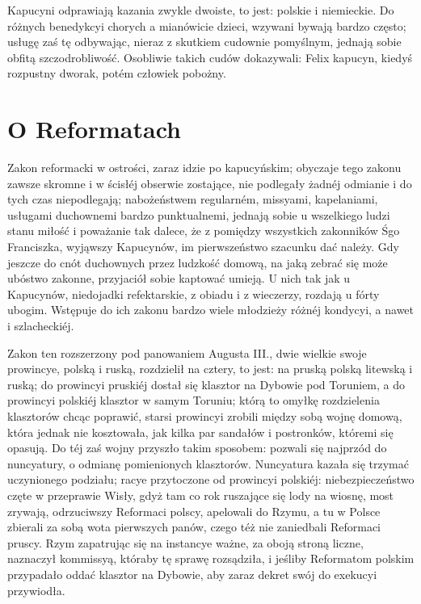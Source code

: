 \documentclass{book}
\begin{document}
Kapucyni odprawiają kazania zwykle dwoiste, to jest: polskie i niemieckie. Do różnych benedykcyi chorych a mianówicie dzieci, wzywani bywają bardzo często; usługę zaś tę odbywając, nieraz z skutkiem cudownie pomyślnym, jednają sobie obfitą szczodrobliwość. Osobliwie takich cudów dokazywali: Felix kapucyn, kiedyś rozpustny dworak, potém człowiek pobożny.

\section{O Reformatach}

Zakon reformacki w ostrości, zaraz idzie po kapucyńskim; obyczaje tego zakonu zawsze skromne i w ścisłéj obserwie zostające, nie podlegały żadnéj odmianie i do tych czas niepodlegają; nabożeństwem regularném, missyami, kapelaniami, usługami duchownemi bardzo punktualnemi, jednają sobie u wszelkiego ludzi stanu miłość i poważanie tak dalece, że z pomiędzy wszystkich zakonników Śgo Franciszka, wyjąwszy Kapucynów, im pierwszeństwo szacunku dać należy. Gdy jeszcze do cnót duchownych przez ludzkość domową, na jaką zebrać się może ubóstwo zakonne, przyjaciół sobie kaptować umieją. U nich tak jak u Kapucynów, niedojadki refektarskie, z obiadu i z wieczerzy, rozdają u fórty ubogim. Wstępuje do ich zakonu bardzo wiele młodzieży różnéj kondycyi, a nawet i szlacheckiéj.

Zakon ten rozszerzony pod panowaniem Augusta III., dwie wielkie swoje prowincye, polską i ruską, rozdzielił na cztery, to jest: na pruską polską litewską i ruską; do prowincyi pruskiéj dostał się klasztor na Dybowie pod Toruniem, a do prowincyi polskiéj klasztor w samym Toruniu; którą to omyłkę rozdzielenia klasztorów chcąc poprawić, starsi prowincyi zrobili między sobą wojnę domową, która jednak nie kosztowała, jak kilka par sandałów i postronków, któremi się opasują. Do téj zaś wojny przyszło takim sposobem: pozwali się najprzód do nuncyatury, o odmianę pomienionych klasztorów. Nuncyatura kazała się trzymać uczynionego podziału; racye przytoczone od prowincyi polskiéj: niebezpieczeństwo częte w przeprawie Wisły, gdyż tam co rok ruszające się lody na wiosnę, most zrywają, odrzuciwszy Reformaci polscy, apelowali do Rzymu, a tu w Polsce zbierali za sobą wota pierwszych panów, czego téż nie zaniedbali Reformaci pruscy. Rzym zapatrując się na instancye ważne, za oboją stroną liczne, naznaczył kommissyą, któraby tę sprawę rozsądziła, i jeśliby Reformatom polskim przypadało oddać klasztor na Dybowie, aby zaraz dekret swój do exekucyi przywiodła.
\end{document}

